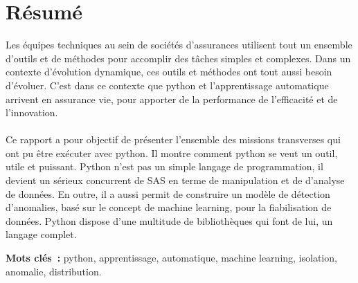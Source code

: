 \chapter*{Résumé} 



Les équipes techniques au sein de sociétés d'assurances utilisent tout un ensemble d'outils et de méthodes pour accomplir des tâches simples et complexes. Dans un contexte d'évolution dynamique, ces outils et méthodes ont tout aussi besoin d'évoluer. C'est dans ce contexte que python et l'apprentissage automatique arrivent en assurance vie, pour apporter de la performance de l'efficacité et de l'innovation. 
\\
\\
Ce rapport a pour objectif de présenter l'ensemble des missions transverses qui ont pu être exécuter avec python. Il montre comment python se veut un outil, utile et puissant. Python n'est pas un simple langage de programmation, il devient un sérieux concurrent de SAS en terme de manipulation et de d'analyse de données. En outre, il a aussi permit de construire un modèle de détection d'anomalies, basé sur le concept de machine learning, pour la fiabilisation de données. Python dispose d'une multitude de bibliothèques qui font de lui, un langage complet.

\begin{singlespace}
\textbf{Mots clés~:} python, apprentissage, automatique, machine learning, isolation, anomalie, distribution.
\end{singlespace}